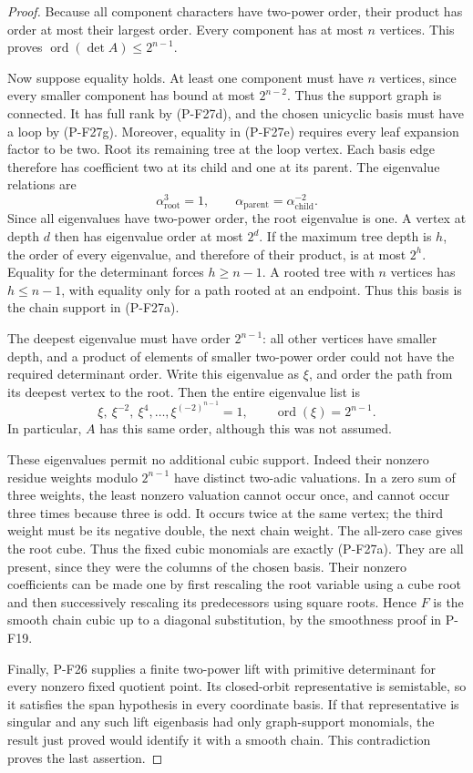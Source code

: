 \begin{proof}
Because all component characters have two-power order,
their product has order at most their largest order.
Every component has at most $n$ vertices. This proves
$\operatorname{ord}(\det A)\le2^{n-1}$.

Now suppose equality holds. At least one component must
have $n$ vertices, since every smaller component has
bound at most $2^{n-2}$. Thus the support graph is
connected. It has full rank by (P-F27d), and the chosen
unicyclic basis must have a loop by (P-F27g). Moreover,
equality in (P-F27e) requires every leaf expansion factor
to be two. Root its remaining tree at the loop vertex.
Each basis edge therefore has coefficient two at its
child and one at its parent. The eigenvalue relations are
\[
 \alpha_{\mathrm{root}}^3=1,\qquad
 \alpha_{\mathrm{parent}}=\alpha_{\mathrm{child}}^{-2}.
 \tag{P-F27h}
\]
Since all eigenvalues have two-power order, the root
eigenvalue is one. A vertex at depth $d$ then has
eigenvalue order at most $2^d$. If the maximum tree
depth is $h$, the order of every eigenvalue, and therefore
of their product, is at most $2^h$. Equality for the
determinant forces $h\ge n-1$. A rooted tree with $n$
vertices has $h\le n-1$, with equality only for a path
rooted at an endpoint. Thus this basis is the chain
support in (P-F27a).

The deepest eigenvalue must have order $2^{n-1}$: all
other vertices have smaller depth, and a product of
elements of smaller two-power order could not have the
required determinant order. Write this eigenvalue as
$\xi$, and order the path from its deepest vertex to the
root. Then the entire eigenvalue list is
\[
 \xi,\ \xi^{-2},\ \xi^4,\ldots,
 \xi^{(-2)^{n-1}}=1,
 \qquad \operatorname{ord}(\xi)=2^{n-1}.
 \tag{P-F27i}
\]
In particular, $A$ has this same order, although this
was not assumed.

These eigenvalues permit no additional cubic support.
Indeed their nonzero residue weights modulo $2^{n-1}$
have distinct two-adic valuations. In a zero sum of
three weights, the least nonzero valuation cannot occur
once, and cannot occur three times because three is
odd. It occurs twice at the same vertex; the third
weight must be its negative double, the next chain
weight. The all-zero case gives the root cube. Thus the
fixed cubic monomials are exactly (P-F27a). They are all
present, since they were the columns of the chosen basis.
Their nonzero coefficients can be made one by first
rescaling the root variable using a cube root and then
successively rescaling its predecessors using square
roots. Hence $F$ is the smooth chain cubic up to a
diagonal substitution, by the smoothness proof in P-F19.

Finally, P-F26 supplies a finite two-power lift with
primitive determinant for every nonzero fixed quotient
point. Its closed-orbit representative is semistable,
so it satisfies the span hypothesis in every coordinate
basis. If that representative is singular and any such
lift eigenbasis had only graph-support monomials, the
result just proved would identify it with a smooth
chain. This contradiction proves the last assertion.
\end{proof}

